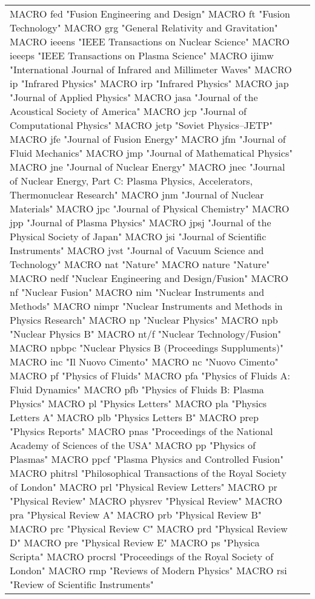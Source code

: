\documentclass{article}
\begin{document}
\begin{longtable}{lp{6cm}}
MACRO {fed} {"Fusion Engineering and Design"}
MACRO {ft} {"Fusion Technology"}
MACRO {grg} {"General Relativity and Gravitation"}
MACRO {ieeens} {"IEEE Transactions on Nuclear Science"}
MACRO {ieeeps} {"IEEE Transactions on Plasma Science"}
MACRO {ijimw} {"International Journal of Infrared and Millimeter Waves"}
MACRO {ip} {"Infrared Physics"}
MACRO {irp} {"Infrared Physics"}
MACRO {jap} {"Journal of Applied Physics"}
MACRO {jasa} {"Journal of the Acoustical Society of America"}
MACRO {jcp} {"Journal of Computational Physics"}
MACRO {jetp} {"Soviet Physics--JETP"}
MACRO {jfe} {"Journal of Fusion Energy"}
MACRO {jfm} {"Journal of Fluid Mechanics"}
MACRO {jmp} {"Journal of Mathematical Physics"}
MACRO {jne} {"Journal of Nuclear Energy"}
MACRO {jnec} {"Journal of Nuclear Energy, Part C: Plasma Physics, Accelerators, Thermonuclear Research"}
MACRO {jnm} {"Journal of Nuclear Materials"}
MACRO {jpc} {"Journal of Physical Chemistry"}
MACRO {jpp} {"Journal of Plasma Physics"}
MACRO {jpsj} {"Journal of the Physical Society of Japan"}
MACRO {jsi} {"Journal of Scientific Instruments"}
MACRO {jvst} {"Journal of Vacuum Science and Technology"}
MACRO {nat} {"Nature"}
MACRO {nature} {"Nature"}
MACRO {nedf} {"Nuclear Engineering and Design/Fusion"}
MACRO {nf} {"Nuclear Fusion"}
MACRO {nim} {"Nuclear Instruments and Methods"}
MACRO {nimpr} {"Nuclear Instruments and Methods in Physics Research"}
MACRO {np} {"Nuclear Physics"}
MACRO {npb} {"Nuclear Physics B"}
MACRO {nt/f} {"Nuclear Technology/Fusion"}
MACRO {npbpc} {"Nuclear Physics B (Proceedings Suppluments)"}
MACRO {inc} {"Il Nuovo Cimento"}
MACRO {nc} {"Nuovo Cimento"}
MACRO {pf} {"Physics of Fluids"}
MACRO {pfa} {"Physics of Fluids A: Fluid Dynamics"}
MACRO {pfb} {"Physics of Fluids B: Plasma Physics"}
MACRO {pl} {"Physics Letters"}
MACRO {pla} {"Physics Letters A"}
MACRO {plb} {"Physics Letters B"}
MACRO {prep} {"Physics Reports"}
MACRO {pnas} {"Proceedings of the National Academy of Sciences of the USA"}
MACRO {pp} {"Physics of Plasmas"}
MACRO {ppcf} {"Plasma Physics and Controlled Fusion"}
MACRO {phitrsl} {"Philosophical Transactions of the Royal Society of London"}
MACRO {prl} {"Physical Review Letters"}
MACRO {pr} {"Physical Review"}
MACRO {physrev} {"Physical Review"}
MACRO {pra} {"Physical Review A"}
MACRO {prb} {"Physical Review B"}
MACRO {prc} {"Physical Review C"}
MACRO {prd} {"Physical Review D"}
MACRO {pre} {"Physical Review E"}
MACRO {ps} {"Physica Scripta"}
MACRO {procrsl} {"Proceedings of the Royal Society of London"}
MACRO {rmp} {"Reviews of Modern Physics"}
MACRO {rsi} {"Review of Scientific Instruments"}

\end{longtable}
\end{document}
